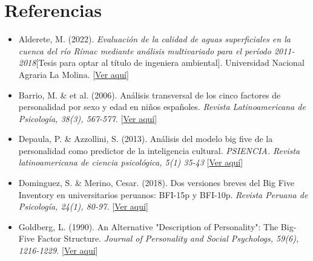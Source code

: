 \documentclass{report}
\begin{document}
\chapter{Referencias}\label{Referencias}


%

\begin{itemize}
\item Alderete, M. (2022).\textit{ Evaluación de la calidad de aguas superficiales en la cuenca del río Rímac mediante análisis multivariado para el período 2011-2018}[Tesis para optar al título de ingeniera ambiental]. Universidad Nacional Agraria La Molina. 
[\textcolor{blue}{\href{http://repositorio.lamolina.edu.pe/bitstream/handle/20.500.12996/5360/alderete-malpartida-marleni-beatriz.pdf?sequence=1&isAllowed=y}{Ver aquí}}]
\vspace{0.4cm}

\item Barrio, M. \& et al. (2006). Análisis transversal de los cinco factores de personalidad por sexo y edad en niños españoles. \textit{ Revista Latinoamericana de Psicología, 38(3), 567-577.}
[\textcolor{blue}{\href{http://pepsic.bvsalud.org/scielo.php?script=sci_arttext&pid=S0120-05342006000300009}{Ver aquí}}]
\vspace{0.4cm}

\item Depaula, P. \& Azzollini, S. (2013). Análisis del modelo big five de la personalidad como predictor de la inteligencia cultural.\textit{ PSIENCIA. Revista latinoamericana de ciencia psicológica, 5(1) 35-43}
[\textcolor{blue}{\href{https://www.redalyc.org/pdf/3331/333127392005.pdf}{Ver aquí}}]
\vspace{0.4cm}

\item Dominguez, S. \& Merino, Cesar. (2018). Dos versiones breves del Big Five Inventory en universitarios peruanos:
BFI-15p y BFI-10p.\textit{ Revista Peruana de Psicología, 24(1), 80-97.}
[\textcolor{blue}{\href{https://www.redalyc.org/journal/686/68656777006/68656777006.pdf}{Ver aquí}}]
\vspace{0.4cm}

\item Goldberg, L. (1990). An Alternative "Description of Personality": The Big-Five Factor Structure.\textit{ Journal of Personality and Social Psychologs, 59(6), 1216-1229.}
[\textcolor{blue}{\href{https://projects.ori.org/lrg/PDFs_papers/Goldberg.Big-Five-FactorsStructure.JPSP.1990.pdf}{Ver aquí}}]
\vspace{0.4cm}


\end{itemize}
\end{document}
